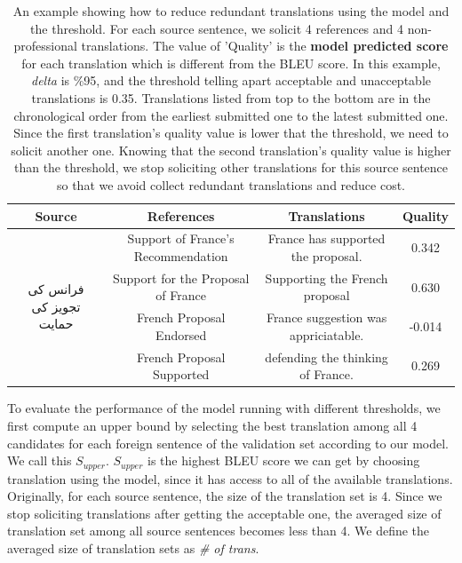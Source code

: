 \documentclass[11pt]{article}
\begin{document}
 \begin{table}[t]
 \center
\begin{tabular}{|c|c|c|c|}
\hline
Source                                   & References                         & Translations                         & Quality \\ \hline
\multirow{4}{*}{فرانس کی تجویز کی حمایت} & Support of France's Recommendation & France has supported the proposal.   & 0.342   \\ \cline{2-4} 
                                         & Support for the Proposal of France & Supporting the French proposal       & 0.630   \\ \cline{2-4} 
                                         & French Proposal Endorsed           & France suggestion was appriciatable. & -0.014  \\ \cline{2-4} 
                                         & French Proposal Supported          & defending the thinking of France.    & 0.269   \\ \hline
\end{tabular}
\caption{An example showing how to reduce redundant translations using the  model and the threshold. For each source sentence, we solicit 4 references and 4 non-professional translations. The value of 'Quality' is the \textbf{ model predicted score} for each translation which is different from the BLEU score. In this example, \textit{delta} is \%95, and the threshold telling apart acceptable and unacceptable translations is 0.35. Translations listed from top to the bottom are in the chronological order from the earliest submitted one to the latest submitted one. Since the first translation's quality value is lower that the threshold, we need to solicit another one.  Knowing that the second translation's quality value is higher than the threshold,  we stop soliciting other translations for this source sentence so that we avoid collect redundant translations and reduce cost.}
\label{texample}
\end{table}
 
To evaluate the performance of the model running with different thresholds, we first compute an upper bound by selecting the best translation among all 4 candidates for each foreign sentence of the validation set according to our  model. We call this  $S_{upper}$.  $S_{upper}$ is the highest BLEU score we can get by choosing translation using the model, since it has access to all of the available translations. Originally, for each source sentence, the size of the translation set is 4. Since we stop soliciting translations after getting the acceptable one, the averaged size of translation set among all source sentences becomes less than 4. We define the averaged size of translation sets as \textit{\# of trans}.
\end{document}

